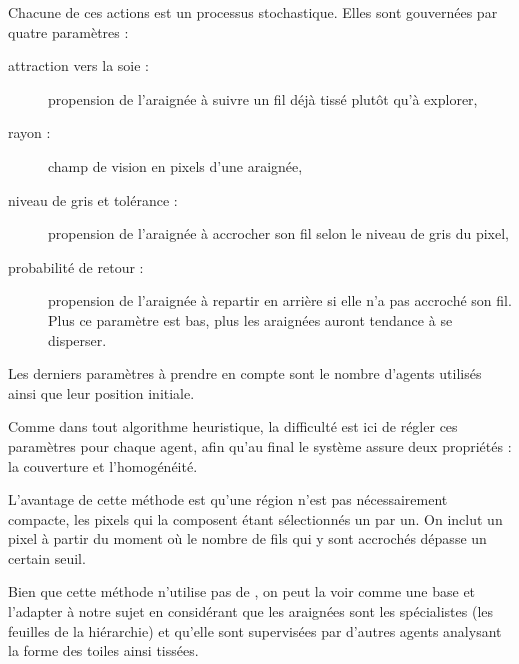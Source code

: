 Chacune de ces actions est un processus stochastique. Elles sont gouvernées par quatre paramètres :
\begin{description}
  \item[attraction vers la soie :] propension de l'araignée à suivre un fil déjà tissé plutôt qu'à explorer,
  \item[rayon :] champ de vision en pixels d'une araignée,
  \item[niveau de gris et tolérance :] propension de l'araignée à accrocher son fil selon le niveau de gris du pixel,
  \item[probabilité de retour :] propension de l'araignée à repartir en arrière si elle n'a pas accroché son fil. Plus ce paramètre est bas, plus les araignées auront tendance à se disperser.
\end{description}
Les derniers paramètres à prendre en compte sont le nombre d'agents utilisés ainsi que leur position initiale.

Comme dans tout algorithme heuristique, la difficulté est ici de régler ces paramètres pour chaque agent, afin qu'au final le système assure deux propriétés : la couverture et l'homogénéité.

L'avantage de cette méthode est qu'une région n'est pas nécessairement compacte, les pixels qui la composent étant sélectionnés un par un. On inclut un pixel à partir du moment où le nombre de fils qui y sont accrochés dépasse un certain seuil.

Bien que cette méthode n'utilise pas de \smahLong{}, on peut la voir comme une base et l'adapter à notre sujet en considérant que les araignées sont les spécialistes (les \og{}feuilles \fg{} de la hiérarchie) et qu'elle sont supervisées par d'autres agents analysant la forme des toiles ainsi tissées.

